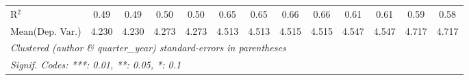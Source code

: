 \begin{tabular}{lcccccccccccc}
   R$^2$                                    & 0.49    & 0.49          & 0.50    & 0.50         & 0.65       & 0.65    & 0.66    & 0.66          & 0.61        & 0.61          & 0.59    & 0.58\\  
Mean(Dep. Var.) & 4.230 & 4.230 & 4.273 & 4.273 & 4.513 & 4.513 & 4.515 & 4.515 & 4.547 & 4.547 & 4.717 & 4.717 \\
   \midrule \midrule
   \multicolumn{13}{l}{\emph{Clustered (author \& quarter\_year) standard-errors in parentheses}}\\
   \multicolumn{13}{l}{\emph{Signif. Codes: ***: 0.01, **: 0.05, *: 0.1}}\\
\end{tabular}
\par\endgroup
